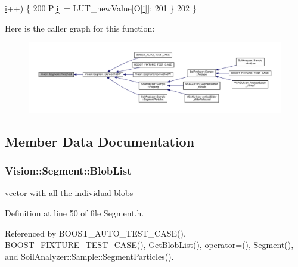 \begin{DoxyCode}
      \hyperlink{_comparision_pictures_2_createtest_image_8m_a6f6ccfcf58b31cb6412107d9d5281426}{i}++) \{
200     P[\hyperlink{_comparision_pictures_2_createtest_image_8m_a6f6ccfcf58b31cb6412107d9d5281426}{i}] = LUT\_newValue[O[\hyperlink{_comparision_pictures_2_createtest_image_8m_a6f6ccfcf58b31cb6412107d9d5281426}{i}]];
201   \}
202 \}
\end{DoxyCode}


Here is the caller graph for this function\+:\nopagebreak
\begin{figure}[H]
\begin{center}
\leavevmode
\includegraphics[width=350pt]{class_vision_1_1_segment_a1d486dd3b67e1e1208c9ca04be8f6659_icgraph}
\end{center}
\end{figure}




\subsection{Member Data Documentation}
\hypertarget{class_vision_1_1_segment_a74e0600a7dd49bd7110ee27bb4cd6e0e}{}
\subsubsection[{Blob\+List}]{ Vision\+::\+Segment\+::\+Blob\+List}\label{class_vision_1_1_segment_a74e0600a7dd49bd7110ee27bb4cd6e0e}
vector with all the individual blobs 

Definition at line 50 of file Segment.\+h.



Referenced by B\+O\+O\+S\+T\+\_\+\+A\+U\+T\+O\+\_\+\+T\+E\+S\+T\+\_\+\+C\+A\+S\+E(), B\+O\+O\+S\+T\+\_\+\+F\+I\+X\+T\+U\+R\+E\+\_\+\+T\+E\+S\+T\+\_\+\+C\+A\+S\+E(), Get\+Blob\+List(), operator=(), Segment(), and Soil\+Analyzer\+::\+Sample\+::\+Segment\+Particles().

\hypertarget{class_vision_1_1_segment_a4daa143f6cd4a753d3bbe45c6a67d27f}{}
